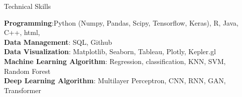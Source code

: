 \documentclass{resume} %
\begin{document}
	
\begin{rSection}{Technical Skills}
	
	{\bf Programming}:Python (Numpy, Pandas, Scipy, Tensorflow, Keras), R, Java, C++, html, \\
	{\bf Data Management}: SQL, Github \\
	{\bf Data Visualization}: Matplotlib, Seaborn, Tableau, Plotly, Kepler.gl \\
	{\bf Machine Learning Algorithm}: Regression, classification, KNN, SVM, Random Forest\\
	{\bf Deep Learning Algorithm}: Multilayer Perceptron, CNN, RNN, GAN, Transformer\\
\end{rSection}
\end{document}
